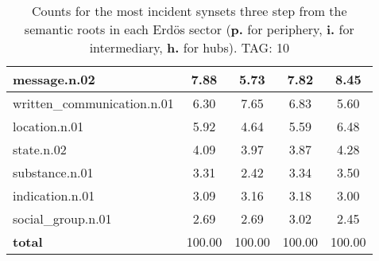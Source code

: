 \begin{table}[h!]
\begin{center}
\begin{tabular}{| l || c | c | c | c |}
message.n.02 & 7.88  & 5.73  & 7.82  & 8.45 \\\hline
written\_communication.n.01 & 6.30  & 7.65  & 6.83  & 5.60 \\\hline
location.n.01 & 5.92  & 4.64  & 5.59  & 6.48 \\\hline
state.n.02 & 4.09  & 3.97  & 3.87  & 4.28 \\\hline
substance.n.01 & 3.31  & 2.42  & 3.34  & 3.50 \\\hline
indication.n.01 & 3.09  & 3.16  & 3.18  & 3.00 \\\hline
social\_group.n.01 & 2.69  & 2.69  & 3.02  & 2.45 \\\hline\hline
{{\bf total}} & 100.00  & 100.00  & 100.00  & 100.00 \\\hline
\end{tabular}
\caption{Counts for the most incident synsets three step from the semantic roots in each Erd\"os sector ({\bf p.} for periphery, {\bf i.} for intermediary, {\bf h.} for hubs). TAG: 10}
\end{center}
\end{table}